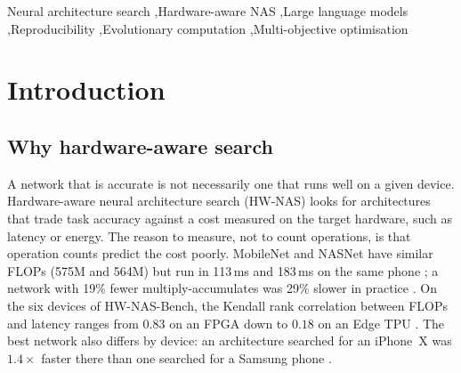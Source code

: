 \documentclass[preprint,12pt]{elsarticle}
\begin{document}
\begin{frontmatter}
\begin{keyword}
Neural architecture search \sep Hardware-aware NAS \sep Large language models \sep Reproducibility \sep Evolutionary computation \sep Multi-objective optimisation
\end{keyword}

\end{frontmatter}

\section{Introduction}\label{sec:intro}

\subsection{Why hardware-aware search}
A network that is accurate is not necessarily one that runs well on a given device. Hardware-aware neural architecture search (HW-NAS) looks for architectures that trade task accuracy against a cost measured on the target hardware, such as latency or energy. The reason to measure, not to count operations, is that operation counts predict the cost poorly. MobileNet and NASNet have similar FLOPs (575M and 564M) but run in 113\,ms and 183\,ms on the same phone \cite{mnasnet}; a network with 19\% fewer multiply-accumulates was 29\% slower in practice \cite{netadapt}. On the six devices of HW-NAS-Bench, the Kendall rank correlation between FLOPs and latency ranges from $0.83$ on an FPGA down to $0.18$ on an Edge TPU \cite{hwnasbench}. The best network also differs by device: an architecture searched for an iPhone~X was $1.4\times$ faster there than one searched for a Samsung phone \cite{fbnet}.
\end{document}
